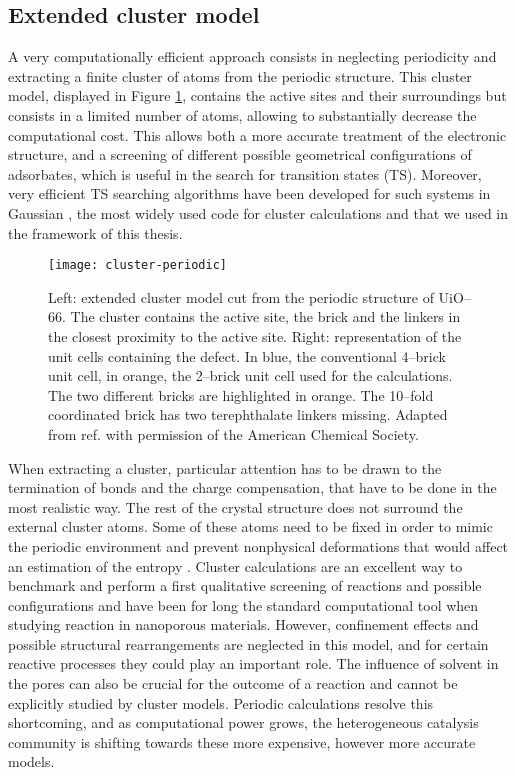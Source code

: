 \subsection*{Extended cluster model}
A very computationally efficient approach consists in neglecting periodicity and extracting a finite cluster of atoms from the periodic structure. This cluster model, displayed in Figure \ref{fig:cluster-periodic}, contains the active sites and their surroundings but consists in a limited number of atoms, allowing to substantially decrease the computational cost. 
This allows both a more accurate treatment of the electronic structure, and a screening of different possible geometrical configurations of adsorbates, which is useful in the search for transition states (TS). Moreover, very efficient TS searching algorithms have been developed for such systems in Gaussian \cite{frisch2015gaussian}, the most widely used code for cluster calculations and that we used in the framework of this thesis.
\begin{figure}[!htbp]
	\centering
 	\texttt{[image: cluster-periodic]}
	\caption{Left: extended cluster model cut from the periodic structure of UiO--66. The cluster contains the active site, the brick and the linkers in the closest proximity to the active site. Right: representation of the unit cells containing the defect. In blue, the conventional 4--brick unit cell, in orange, the 2--brick unit cell used for the calculations. The two different bricks are highlighted in orange. The 10--fold coordinated brick has two terephthalate linkers missing. Adapted from ref. \cite{caratelli2017nature} with permission of the American Chemical Society.}
	\label{fig:cluster-periodic}
\end{figure}
When extracting a cluster, particular attention has to be drawn to the termination of bonds and the charge compensation, that have to be done in the most realistic way. The rest of the crystal structure does not surround the external cluster atoms. Some of these atoms need to be fixed in order to mimic the periodic environment and prevent nonphysical deformations that would affect an estimation of the entropy \cite{DeWispelaere2018}.
\npar
Cluster calculations are an excellent way to benchmark and perform a first qualitative screening of reactions and possible configurations and have been for long the standard computational tool when studying reaction in nanoporous materials. However, confinement effects and possible structural rearrangements are neglected in this model, and for certain reactive processes they could play an important role. The influence of solvent in the pores can also be crucial for the outcome of a reaction and cannot be explicitly studied by cluster models. Periodic calculations resolve this shortcoming, and as computational power grows, the heterogeneous catalysis community is shifting towards these more expensive, however more accurate models. 

